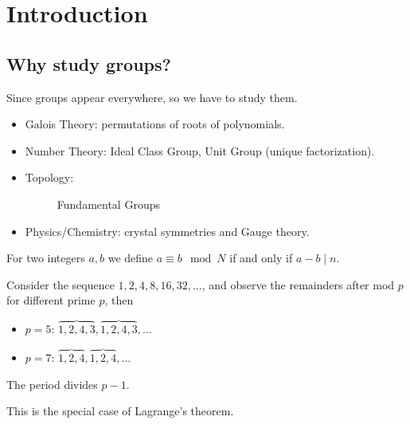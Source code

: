 \chapter{Introduction}
\section{Why study groups?}
Since groups appear everywhere, so we have to study them.
\begin{itemize}
    \item Galois Theory: permutations of roots of polynomials. 
    \item Number Theory: Ideal Class Group, Unit Group (unique factorization). 
    \item Topology: 
    \begin{figure}[H]
        \centering
        \caption{Fundamental Groups}
        \label{fig:DonutCup}
    \end{figure}
    \item Physics/Chemistry: crystal symmetries and Gauge theory.
\end{itemize}

\begin{definition}[mod] \label{def: mod}
    For two integers \(a,b\) we define \(a \equiv b \mod{N}\) if and only if \(a - b \mid n\).  
\end{definition}

Consider the sequence \(1,2,4,8,16,32, \dots \), and observe the remainders after mod \(p\) for different prime \(p\), then 
\begin{itemize}
    \item \(p=5\): \(\overbrace{1,2,4,3}, \overbrace{1,2,4,3}, \dots \)
    \item \(p=7\): \(\overbrace{1,2,4}, \overbrace{1,2,4}, \dots \) 
\end{itemize}   

\begin{theorem} \label{thm: Fermat's little theorem}
    The period divides \(p-1\). 
\end{theorem}
\begin{note}
    This is the special case of Lagrange's theorem.
\end{note}

